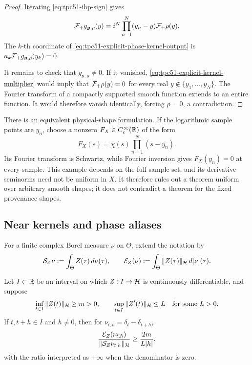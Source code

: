 \begin{proof}
Iterating \eqref{eq:tpc51-ibp-sign} gives
\begin{equation}
 \mathcal F_+g_{\bm y,\rho}(y)
 =i^N\prod_{n=1}^N(y_n-y)\mathcal F_+\rho(y).
 \label{eq:tpc51-explicit-kernel-multiplier}
\end{equation}
The \(k\)-th coordinate of
\eqref{eq:tpc51-explicit-phase-kernel-output} is
\(a_k\mathcal F_+g_{\bm y,\rho}(y_k)=0\).

It remains to check that \(g_{\bm y,\rho}\ne0\).  If it vanished,
\eqref{eq:tpc51-explicit-kernel-multiplier} would imply that
\(\mathcal F_+\rho(y)=0\) for every real
\(y\notin\{y_1,\ldots,y_N\}\).
The Fourier transform of a compactly supported smooth function extends
to an entire function.  It would therefore vanish identically, forcing
\(\rho=0\), a contradiction.
\end{proof}

There is an equivalent physical-shape formulation.  If the logarithmic
sample points are \(y_n\), choose a nonzero
\(F_X\in C_c^\infty(\mathbb R)\) of the form
\begin{equation}
 F_X(s)=\chi(s)\prod_{n=1}^N(s-y_n).
 \label{eq:tpc51-sample-zero-shape}
\end{equation}
Its Fourier transform is Schwartz, while Fourier inversion gives
\(F_X(y_n)=0\) at every sample.  This example depends on the full sample
set, and its derivative seminorms need not be uniform in \(X\).  It
therefore rules out a theorem uniform over arbitrary smooth shapes; it
does not contradict a theorem for the fixed provenance shapes.

\subsection{Near kernels and phase aliases}

For a finite complex Borel measure \(\nu\) on \(\Theta\), extend the
notation by
\begin{equation}
 \mathcal S_Z\nu:=\int_\Theta Z(\tau)\,d\nu(\tau),
 \qquad
 \mathcal E_Z(\nu):=\int_\Theta\|Z(\tau)\|_\mathcal H\,d|\nu|(\tau).
 \label{eq:tpc51-measure-synthesis}
\end{equation}

\begin{proposition}
\label{prop:tpc51-neighboring-atoms}
\label{prop:tpc51-neighbouring-atoms}
Let \(I\subset\mathbb R\) be an interval on which \(Z:I\to\mathcal H\) is
continuously differentiable, and suppose
\begin{equation}
 \inf_{t\in I}\|Z(t)\|_\mathcal H\ge m>0,
 \qquad
 \sup_{t\in I}\|Z'(t)\|_\mathcal H\le L
 \quad\text{for some }L>0.
 \label{eq:tpc51-atom-regularity}
\end{equation}
If \(t,t+h\in I\) and \(h\ne0\), then for
\(\nu_{t,h}=\delta_t-\delta_{t+h}\),
\begin{equation}
 \frac{\mathcal E_Z(\nu_{t,h})}
      {\|\mathcal S_Z\nu_{t,h}\|_\mathcal H}
 \ge\frac{2m}{L|h|},
 \label{eq:tpc51-neighbor-condition}
\end{equation}
with the ratio interpreted as \(+\infty\) when the denominator is zero.
\end{proposition}

